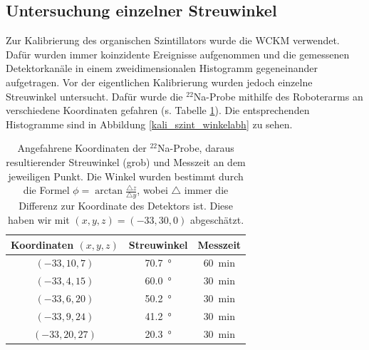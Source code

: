 \subsection{Untersuchung einzelner Streuwinkel}

Zur Kalibrierung des organischen Szintillators wurde die WCKM verwendet. Dafür wurden immer koinzidente Ereignisse aufgenommen und die gemessenen Detektorkanäle in einem zweidimensionalen Histogramm gegeneinander aufgetragen. Vor der eigentlichen Kalibrierung wurden jedoch einzelne Streuwinkel untersucht. Dafür wurde die $^{22}$Na-Probe mithilfe des Roboterarms an verschiedene Koordinaten gefahren (s. Tabelle \ref{kali_szint_coords}). Die entsprechenden Histogramme sind in Abbildung \ref{kali_szint_winkelabh} zu sehen.

\begin{table}[h]
    \centering
    \begin{tabular}{|c | c |c |}
        \hline
        Koordinaten $(x,y,z)$  & Streuwinkel & Messzeit \\
        \hline
        $(-33, 10, 7)$ & \SI{70.7}{\degree} & \SI{60}{\minute} \\
        $(-33, 4, 15)$ & \SI{60.0}{\degree} & \SI{30}{\minute} \\
        $(-33, 6, 20)$ & \SI{50.2}{\degree} & \SI{30}{\minute} \\
        $(-33, 9, 24)$ & \SI{41.2}{\degree} & \SI{30}{\minute} \\
        $(-33, 20, 27)$ & \SI{20.3}{\degree} & \SI{30}{\minute} \\
        \hline
    \end{tabular}
    \caption{Angefahrene Koordinaten der $^{22}$Na-Probe, daraus resultierender Streuwinkel (grob) und Messzeit an dem jeweiligen Punkt. Die Winkel wurden bestimmt durch die Formel $\phi = \arctan{\frac{\triangle z}{\triangle y}}$, wobei $\triangle$ immer die Differenz zur Koordinate des Detektors ist. Diese haben wir mit $(x,y,z) = (-33, 30, 0)$ abgeschätzt.}
    \label{kali_szint_coords}
\end{table}

